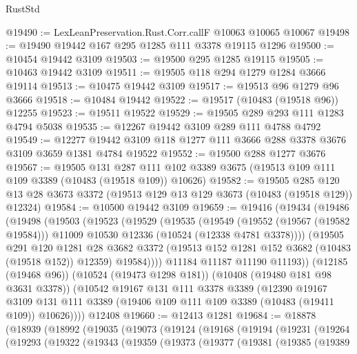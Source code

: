 \begin{lexlean}{RustStd}
\begin{coremodule}
@19490 := LexLeanPreservation.Rust.Corr.callF @10063 @10065 @10067
@19498 := @19490 @19442 @167 @295 @1285 @111 @3378 @19115 @1296
@19500 := @10454 @19442 @3109
@19503 := @19500 @295 @1285 @19115
@19505 := @10463 @19442 @3109
@19511 := @19505 @118 @294 @1279 @1284 @3666 @19114
@19513 := @10475 @19442 @3109
@19517 := @19513 @96 @1279 @96 @3666
@19518 := @10484 @19442
@19522 := @19517 (@10483 (@19518 @96)) @12255
@19523 := @19511 @19522
@19529 := @19505 @289 @293 @111 @1283 @4794 @5038
@19535 := @12267 @19442 @3109 @289 @111 @4788 @4792
@19549 := @12277 @19442 @3109 @118 @1277 @111 @3666 @288 @3378 @3676 @3109 @3659 @1381 @4784 @19522
@19552 := @19500 @288 @1277 @3676
@19567 := @19505
    @131
    @287
    @111
    @102
    @3389
    @3675
    (@19513 @109 @111 @109 @3389 (@10483 (@19518 @109)) @10626)
@19582 := @19505
    @285
    @120
    @13
    @28
    @3673
    @3372
    (@19513 @129 @13 @129 @3673 (@10483 (@19518 @129)) @12324)
@19584 := @10500 @19442 @3109
@19659 := @19416
    (@19434
      (@19486
        (@19498
          (@19503
            (@19523
              (@19529
                (@19535
                  (@19549
                    (@19552 (@19567 (@19582 @19584)))
                    @11009
                    @10530
                    @12336
                    (@10524 (@12338 @4781 @3378))))
                (@19505
                  @291
                  @120
                  @1281
                  @28
                  @3682
                  @3372
                  (@19513 @152 @1281 @152 @3682 (@10483 (@19518 @152)) @12359)
                  @19584))))
          @11184
          @11187
          @11190
          @11193))
      (@12185 (@19468 @96))
      (@10524 (@19473 @1298 @181))
      (@10408 (@19480 @181 @98 @3631 @3378))
      (@10542
        @19167
        @131
        @111
        @3378
        @3389
        (@12390
          @19167
          @3109
          @131
          @111
          @3389
          (@19406 @109 @111 @109 @3389 (@10483 (@19411 @109)) @10626))))
    @12408
@19660 := @12413 @1281
@19684 := @18878
    (@18939
      (@18992
        (@19035
          (@19073
            (@19124
              (@19168
                (@19194
                  (@19231
                    (@19264
                      (@19293
                        (@19322
                          (@19343
                            (@19359
                              (@19373
                                (@19377
                                  (@19381
                                    (@19385
                                      (@19389

\end{coremodule}
\end{lexlean}
